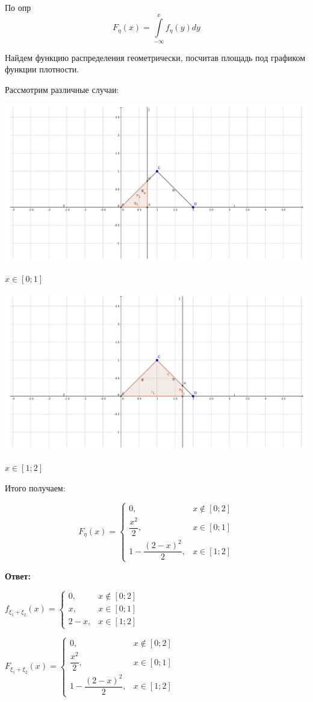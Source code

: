 \documentclass[a4paper,12pt]{article}
\newcommand{\dfr}{\dfrac}
\begin{document}
По опр 
\begin{equation}
F_{\eta}(x) = \int\limits_{-\infty}^{x}f_{\eta}(y)dy
\end{equation}

Найдем функцию распределения геометрически, посчитав площадь под графиком функции плотности.

Рассмотрим различные случаи:



\includegraphics[width=\textwidth]{image2.pdf}

$x \in [0;1]$

\includegraphics[width=\textwidth]{image3.pdf}

$x \in [1;2]$

Итого получаем:

\begin{equation}
F_{\eta}(x) = 
\begin{cases}
0,& x \notin[0;2]\\
\dfr{x^2}{2},& x \in[0;1]\\
1 - \dfr{(2 - x)^2}{2},& x\in [1;2]
\end{cases}
\end{equation}

\textbf{Ответ:}

$
f_{\xi_1 + \xi_2}(x)
=
\begin{cases}
	0,& x \notin[0;2]\\
	x,& x \in[0;1]\\
	2 - x,& x\in [1;2]
\end{cases}$

$F_{\xi_1 + \xi_2}(x) = 
\begin{cases}
0,& x \notin[0;2]\\
\dfr{x^2}{2},& x \in[0;1]\\
1 - \dfr{(2 - x)^2}{2},& x\in [1;2]
\end{cases}$
\end{document}
